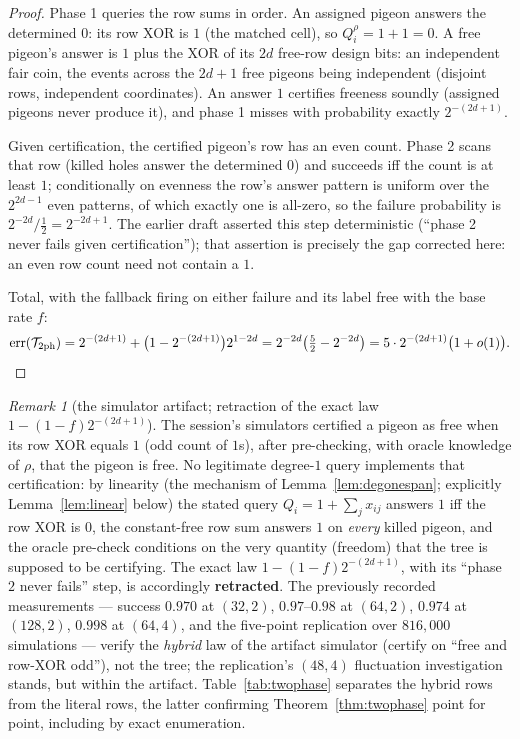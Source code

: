 \documentclass[11pt]{article}
\theoremstyle{definition}
\theoremstyle{remark}
\newtheorem{remark}[theorem]{Remark}
\begin{document}
\begin{proof}
Phase 1 queries the row sums in order.  An assigned pigeon answers the
determined $0$: its row XOR is $1$ (the matched cell), so
$Q_i^{\rho}=1+1=0$.  A free pigeon's answer is $1$ plus the XOR of its
$2d$ free-row design bits: an independent fair coin, the events across
the $2d+1$ free pigeons being independent (disjoint rows, independent
coordinates).  An answer $1$ certifies freeness soundly (assigned
pigeons never produce it), and phase 1 misses with probability exactly
$2^{-(2d+1)}$.

Given certification, the certified pigeon's row has an even count.
Phase 2 scans that row (killed holes answer the determined $0$) and
succeeds iff the count is at least $1$; conditionally on evenness the
row's answer pattern is uniform over the $2^{2d-1}$ even patterns, of
which exactly one is all-zero, so the failure probability is
$2^{-2d}/\frac12=2^{-2d+1}$.  The earlier
draft asserted this step deterministic (``phase 2 never fails given
certification''); that assertion is precisely the gap corrected here:
an even row count need not contain a $1$.

Total, with the fallback firing on either failure and its label free
with the base rate $f$:
\[
\mathrm{err}(\mathcal{T}_{2\mathrm{ph}})
=2^{-(2d+1)}+\bigl(1-2^{-(2d+1)}\bigr)2^{1-2d}
=2^{-2d}\bigl(\tfrac52-2^{-2d}\bigr)
=5\cdot 2^{-(2d+1)}\bigl(1+o(1)\bigr). \qedhere
\]
\end{proof}

\begin{remark}[the simulator artifact; retraction of the exact law
$1-(1-f)2^{-(2d+1)}$]\label{rem:artifact}
The session's simulators certified a pigeon as free when its row XOR
equals $1$ (odd count of $1$s), after pre-checking, with oracle
knowledge of $\rho$, that the pigeon is free.  No legitimate
degree-$1$ query implements that certification: by linearity (the
mechanism of Lemma~\ref{lem:degonespan}; explicitly
Lemma~\ref{lem:linear} below) the stated query $Q_i=1+\sum_jx_{ij}$
answers $1$ iff the row XOR is $0$, the constant-free row sum answers
$1$ on \emph{every} killed pigeon, and the oracle pre-check conditions
on the very quantity (freedom) that the tree is supposed to be
certifying.  The exact law $1-(1-f)2^{-(2d+1)}$, with its ``phase $2$
never fails'' step, is accordingly \textbf{retracted}.  The previously
recorded measurements --- success $0.970$ at $(32,2)$, $0.97$--$0.98$
at $(64,2)$, $0.974$ at $(128,2)$, $0.998$ at $(64,4)$, and the
five-point replication over $816{,}000$ simulations --- verify the
\emph{hybrid} law of the artifact simulator (certify on ``free and
row-XOR odd''), not the tree; the replication's $(48,4)$ fluctuation
investigation stands, but within the artifact.
Table~\ref{tab:twophase} separates the hybrid rows from the literal
rows, the latter confirming Theorem~\ref{thm:twophase} point for
point, including by exact enumeration.
\end{remark}
\end{document}
